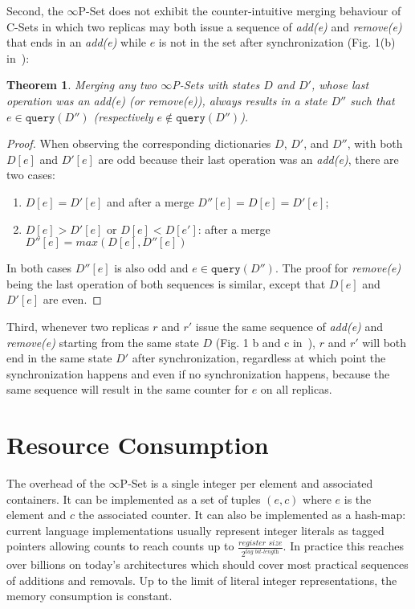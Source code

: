 \documentclass[11pt, oneside]{article}   	%
\newtheorem{theorem}{Theorem}
\begin{document}
Second,  the $\infty$P-Set does not exhibit the counter-intuitive merging behaviour of C-Sets in which two replicas may both issue a sequence of \textit{add(e)} and \textit{remove(e)} that ends in an \textit{add(e)} while $e$ is not in the set after synchronization (Fig. 1(b) in~\cite{bieniusa:hal-00769554}):

\begin{theorem}
Merging any two $\infty$P-Sets with states $D$ and $D'$, whose last operation was an \textit{add(e)} (or \textit{remove(e)}), always results in a state $D''$ such that $e \in \texttt{query}(D'')$ (respectively $e \notin \texttt{query}(D'')$).
\end{theorem}

\begin{proof}
When observing the corresponding dictionaries $D$, $D'$, and $D''$, with both $D[e]$ and $D'[e]$ are odd because their last operation was an \textit{add(e)}, there are two cases:
\begin{enumerate}
    \item $D[e]=D'[e]$ and after a merge $D''[e]=D[e]=D'[e]$;
    \item $D[e]>D'[e]$ or $D[e]<D[e']$: after a merge $D''[e]=max(D[e], D''[e])$
\end{enumerate}   

In both cases $D''[e]$ is also odd and $e \in  \texttt{query}(D'')$.  The proof for \textit{remove(e)} being the last operation of both sequences is similar, except that $D[e]$ and $D'[e]$ are even.
\end{proof}

Third, whenever two replicas $r$ and $r'$ issue the same sequence of \textit{add(e)} and \textit{remove(e)} starting from the same state $D$ (Fig. 1 b and c in~\cite{bieniusa:hal-00769554}), $r$ and $r'$ will both end in the same state $D'$ after synchronization, regardless at which point the synchronization happens and even if no synchronization happens, because the same sequence will result in the same counter for $e$ on all replicas.

\section{Resource Consumption}
\label{sec:resource-consumption}

The overhead of the $\infty$P-Set is a single integer per element and associated containers. It can be implemented as a set of tuples $(e,c)$ where $e$ is the element and $c$ the associated counter. It can also be implemented as a hash-map: current language implementations usually represent integer literals as tagged pointers allowing counts to reach counts up to 
$\frac{\textit{register size}}{2^\textit{tag bit-length}}$. In practice this reaches over billions on today's architectures which should cover most practical sequences of additions and removals. Up to the limit of literal integer representations, the memory consumption is constant.
\end{document}
